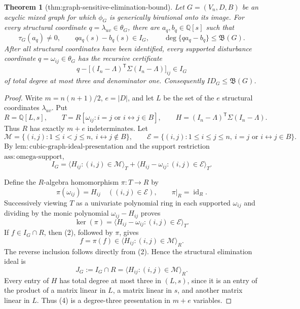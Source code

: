 \documentclass{article}
\newtheorem{theorem}{Theorem}
\begin{document}
\begin{theorem}[thm:graph-sensitive-elimination-bound]\label{thm:graph-sensitive-elimination-bound}
Let \(G=(V_n,D,B)\) be an acyclic mixed graph for which \(\phi_G\) is generically birational onto its image.  For every structural coordinate \(q=\lambda_{uv}\in\theta_G\), there are \(a_q,b_q\in\mathbb Q[s]\) such that
\[
 \tau_G(a_q)\neq0,
 \qquad
 q a_q(s)-b_q(s)\in I_G,
 \qquad
 \deg\{q a_q-b_q\}\leq\mathfrak B(G).
\]
After all structural coordinates have been identified, every supported disturbance coordinate \(q=\omega_{ij}\in\theta_G\) has the recursive certificate
\[
 q-\bigl[(I_n-\Lambda)^{\mathsf T}\Sigma(I_n-\Lambda)\bigr]_{ij}\in I_G
\]
of total degree at most three and denominator one.  Consequently \(ID_G\leq\mathfrak B(G)\).
\end{theorem}
\begin{proof}
Write \(m=n(n+1)/2\), \(e=|D|\), and let \(L\) be the set of the \(e\) structural coordinates \(\lambda_{uv}\).  Put
\[
 R=\mathbb Q[L,s],
 \qquad
 T=R[\omega_{ij}:i=j\text{ or }i\leftrightarrow j\in B],
 \qquad
 H=(I_n-\Lambda)^{\mathsf T}\Sigma(I_n-\Lambda).
 \tag{1}
\]
Thus \(R\) has exactly \(m+e\) indeterminates.  Let
\[
 \mathcal M=\lbrace(i,j):1\leq i<j\leq n,\ i\leftrightarrow j\notin B\rbrace,
 \qquad
 \mathcal E=\lbrace(i,j):1\leq i\leq j\leq n,\ i=j\text{ or }i\leftrightarrow j\in B\rbrace.
\]
By \(\mathrm{lem:cubic\mbox{-}graph\mbox{-}ideal\mbox{-}presentation}\) and the support restriction \(\mathrm{ass:omega\mbox{-}support}\),
\[
 I_G=
 \langle H_{ij}:(i,j)\in\mathcal M\rangle_T
 +\langle H_{ij}-\omega_{ij}:(i,j)\in\mathcal E\rangle_T.
 \tag{2}
\]

Define the \(R\)-algebra homomorphism \(\pi:T\to R\) by
\[
 \pi(\omega_{ij})=H_{ij}\quad ((i,j)\in\mathcal E),
 \qquad
 \pi|_R=\operatorname{id}_R.
\]
Successively viewing \(T\) as a univariate polynomial ring in each supported \(\omega_{ij}\) and dividing by the monic polynomial \(\omega_{ij}-H_{ij}\) proves
\[
 \ker(\pi)=\langle H_{ij}-\omega_{ij}:(i,j)\in\mathcal E\rangle_T.
 \tag{3}
\]
If \(f\in I_G\cap R\), then (2), followed by \(\pi\), gives
\[
 f=\pi(f)\in\langle H_{ij}:(i,j)\in\mathcal M\rangle_R.
\]
The reverse inclusion follows directly from (2).  Hence the structural elimination ideal is
\[
 J_G:=I_G\cap R=\langle H_{ij}:(i,j)\in\mathcal M\rangle_R.
 \tag{4}
\]
Every entry of \(H\) has total degree at most three in \((L,s)\), since it is an entry of the product of a matrix linear in \(L\), a matrix linear in \(s\), and another matrix linear in \(L\).  Thus (4) is a degree-three presentation in \(m+e\) variables.


\end{proof}
\end{document}
